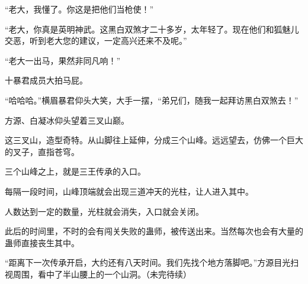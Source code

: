 \begin{this_body}
“老大，我懂了。你这是把他们当枪使！”

“老大，你真是英明神武。这黑白双煞才二十多岁，太年轻了。现在他们和狐魅儿交恶，听到老大您的建议，一定高兴还来不及呢。”

“老大一出马，果然非同凡响！”

十暴君成员大拍马屁。

“哈哈哈。”横眉暴君仰头大笑，大手一摆，“弟兄们，随我一起拜访黑白双煞去！”

方源、白凝冰仰头望着三叉山巅。

这三叉山，造型奇特。从山脚往上延伸，分成三个山峰。远远望去，仿佛一个巨大的叉子，直指苍穹。

三个山峰之上，就是三王传承的入口。

每隔一段时间，山峰顶端就会出现三道冲天的光柱，让人进入其中。

人数达到一定的数量，光柱就会消失，入口就会关闭。

此后的时间里，不时的会有闯关失败的蛊师，被传送出来。当然每次也会有大量的蛊师直接丧生其中。

“距离下一次传承开启，大约还有八天时间。我们先找个地方落脚吧。”方源目光扫视周围，看中了半山腰上的一个山洞。（未完待续）

\end{this_body}


